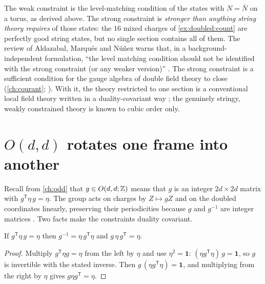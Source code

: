 \begin{pitfallbox}
The weak constraint is the level-matching condition of the states with $N=\bar N$ on a torus,
as derived above. The strong constraint is \emph{stronger than anything string theory requires}
of those states: the $16$ mixed charges of \cref{ex:doubled:count} are perfectly good string
states, but no single section contains all of them. The review of Aldazabal, Marqu\'es and
N\'u\~nez warns that, in a background-independent formulation, ``the level matching condition
should not be identified with the strong constraint (or any weaker version)''
. The strong constraint is a sufficient condition for the
gauge algebra of double field theory to close (\cref{ch:courant}; ). With it, the theory restricted to one section is a conventional local field
theory written in a duality-covariant way ; the genuinely
stringy, weakly constrained theory is known to cubic order only.
\end{pitfallbox}

\section{\texorpdfstring{$O(d,d)$}{O(d,d)} rotates one frame into another}
\label{sec:doubled:rotation}

Recall from \cref{ch:odd} that $g\in O(d,d;\mathbb{Z})$ means that $g$ is an integer $2d\times2d$ matrix
with $g^{\mathsf T}\eta\,g=\eta$. The group acts on charges by $Z\mapsto gZ$ and on the doubled
coordinates linearly, preserving their periodicities because $g$ and $g^{-1}$ are integer
matrices . Two facts make the constraints duality covariant.

\begin{lemma}\label{thm:doubled:inverse}
If $g^{\mathsf T}\eta\,g=\eta$ then $g^{-1}=\eta\,g^{\mathsf T}\eta$ and
$g\,\eta\,g^{\mathsf T}=\eta$.
\end{lemma}
\begin{proof}
Multiply $g^{\mathsf T}\eta g=\eta$ from the left by $\eta$ and use $\eta^2=\mathbf 1$:
$(\eta g^{\mathsf T}\eta)\,g=\mathbf 1$, so $g$ is invertible with the stated inverse. Then
$g\,(\eta g^{\mathsf T}\eta)=\mathbf 1$, and multiplying from the right by $\eta$ gives
$g\eta g^{\mathsf T}=\eta$.
\end{proof}

